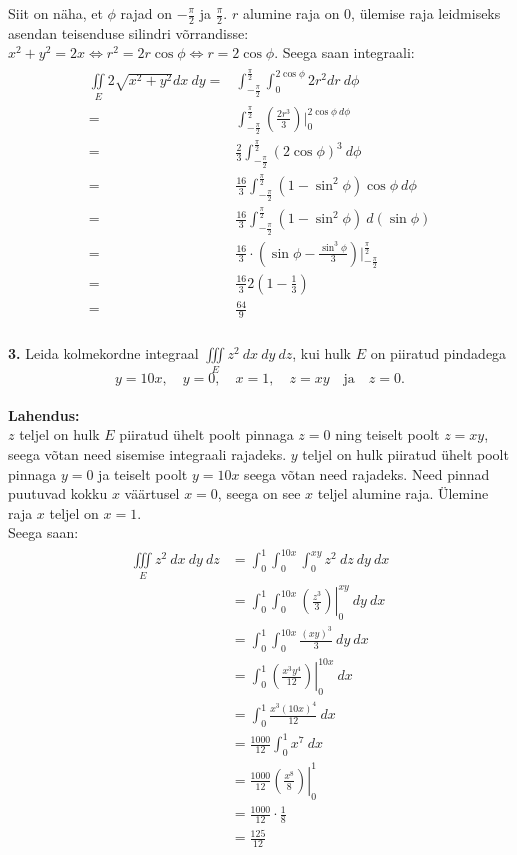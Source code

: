 \documentclass{article}
\begin{document}
Siit on näha, et $\phi$ rajad on $-\frac{\pi}2$ ja $\frac{\pi}2$. $r$ alumine raja on 0, ülemise raja leidmiseks asendan teisenduse silindri võrrandisse: $x^2+y^2=2x \Leftrightarrow r^2=2r\cos\phi\Leftrightarrow r=2\cos\phi$. Seega saan integraali:
\begin{gather*}
\begin{aligned}
\iint\limits_E 2\sqrt{x^2+y^2}dx\ dy=&\int_{-\frac{\pi}2}^\frac{\pi}2\int_0^{2\cos\phi}2r^2dr\ d\phi\\
=&\int_{-\frac{\pi}2}^\frac{\pi}2(\frac{2r^3}{3})\bigg|_0^{2\cos\phi\ d\phi}\\
=&\frac23\int_{-\frac{\pi}2}^\frac{\pi}2(2\cos\phi)^3\ d\phi\\
=&\frac{16}3\int_{-\frac{\pi}2}^{\frac{\pi}2}(1-\sin^2\phi)\cos\phi\ d\phi\\
=&\frac{16}3\int_{-\frac{\pi}2}^{\frac{\pi}2}(1-\sin^2\phi)\ d(\sin\phi)\\
=&\frac{16}3\cdot\left(\sin\phi-\frac{\sin^3\phi}3\right)\bigg|_{-\frac{\pi}2}^{\frac{\pi}2}\\
=&\frac{16}32\left(1-\frac13\right)\\
=&\frac{64}{9}
\end{aligned}
\end{gather*}
\pagebreak\\
\textbf{3. }Leida kolmekordne integraal $\iiint\limits_E z^2\ dx\ dy\ dz$, kui hulk $E$ on piiratud pindadega $$y=10x,\quad y=0,\quad x=1,\quad z=xy\quad \text{ja}\quad z=0.$$\\
\textbf{Lahendus:}\\
$z$ teljel on hulk $E$ piiratud ühelt poolt pinnaga $z=0$ ning teiselt poolt $z=xy$, seega võtan need sisemise integraali rajadeks. $y$ teljel on hulk piiratud ühelt poolt pinnaga $y=0$ ja teiselt poolt $y=10x$ seega võtan need rajadeks. Need pinnad puutuvad kokku $x$ väärtusel $x=0$, seega on see $x$ teljel alumine raja. Ülemine raja $x$ teljel on $x=1$.\\
Seega saan:
\begin{gather*}
\begin{aligned}
\iiint\limits_E z^2\ dx\ dy\ dz &= \int_0^1\int_0^{10x}\int_0^{xy}z^2\ dz\ dy\ dx\\
&=\int_0^1\int_0^{10x}\left(\left.\frac{z^3}{3}\right)\right|_0^{xy}\ dy\ dx\\
&=\int_0^1\int_0^{10x}\frac{(xy)^3}{3}\ dy\ dx\\
&=\int_0^1\left(\left.\frac{x^3y^4}{12}\right)\right|_0^{10x}\ dx\\
&=\int_0^1\frac{x^3(10x)^4}{12}\ dx\\
&=\frac{1000}{12}\int_0^1x^7\ dx\\
&=\frac{1000}{12}\left(\left.\frac{x^8}{8}\right)\right|_0^1\\
&=\frac{1000}{12}\cdot\frac{1}{8}\\
&=\frac{125}{12}\\
\end{aligned}
\end{gather*}
\end{document}
